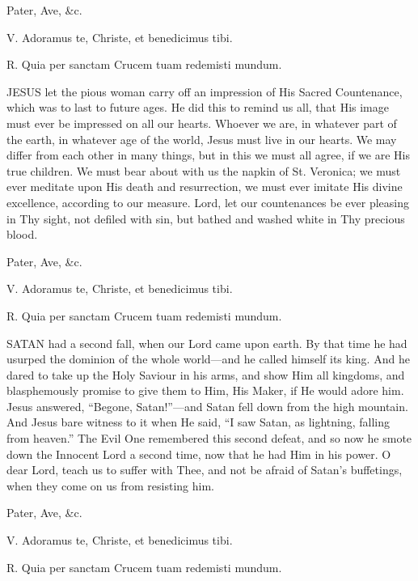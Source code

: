Pater, Ave, \&c.


V. Adoramus te, Christe, et
benedicimus tibi.

R. Quia per sanctam Crucem tuam redemisti mundum.

JESUS let the pious
woman carry off an impression of His Sacred Countenance, which was to
last to future ages. He did this to remind us all, that His image must
ever be impressed on all our hearts. Whoever we are, in whatever part of
the earth, in whatever age of the world, Jesus must live in our hearts.
We may differ from each other in many things, but in this we must all
agree, if we are His true children. We must bear about with us the
napkin of St. Veronica; we must ever meditate upon His death and
resurrection, we must ever imitate His divine excellence, according to
our measure. Lord, let our countenances be ever pleasing in Thy sight,
not defiled with sin, but bathed and washed white in Thy precious blood.

Pater, Ave, \&c.


V. Adoramus te, Christe, et
benedicimus tibi.

R. Quia per sanctam Crucem tuam redemisti mundum.

SATAN had a second
fall, when our Lord came upon earth. By that time he had usurped the
dominion of the whole world—and he called himself its king. And he
dared to take up the Holy Saviour in his arms, and show Him all
kingdoms, and blasphemously promise to give them to Him, His Maker, if
He would adore him. Jesus answered, ``Begone, Satan!''—and Satan fell
down from the high mountain. And Jesus bare witness to it when He said, ``I
saw Satan, as lightning, falling from heaven.'' The Evil One remembered
this second defeat, and so now he smote down the Innocent Lord a second
time, now that he had Him in his power. O dear Lord, teach us to suffer
with Thee, and not be afraid of Satan's buffetings, when they come on us
from resisting him.

Pater, Ave, \&c.


V. Adoramus te, Christe, et
benedicimus tibi.

R. Quia per sanctam Crucem tuam redemisti mundum.

